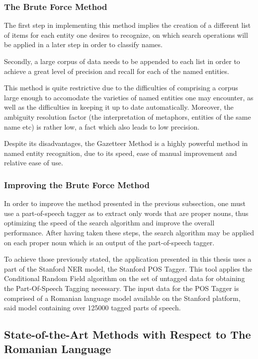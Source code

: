 \documentclass[12pt,a4paper]{article}
\begin{document}
\subsubsection{The Brute Force Method}
\qquad \quad The first step in implementing this method implies the creation of a different list of items for each entity one desires to recognize, on which search operations will be applied in a later step in order to classify names.

\qquad Secondly, a large corpus of data needs to be appended to each list in order to achieve a great level of precision and recall for each of the named entities.

\qquad This method is quite restrictive due to the difficulties of comprising a corpus large enough to accomodate the varieties of named entities one may encounter, as well as the difficulties in keeping it up to date automatically. Moreover, the ambiguity resolution factor (the interpretation of metaphors, entities of the same name etc) is rather low, a fact which also leads to low precision.

\qquad Despite its disadvantages, the Gazetteer Method is a highly powerful method in named entity recognition, due to its speed, ease of manual improvement and relative ease of use.

\subsubsection{Improving the Brute Force Method}

\qquad \quad In order to improve the method presented in the previous subsection, one must use a part-of-speech tagger as to extract only words that are proper nouns, thus optimizing the speed of the search algorithm and improve the overall performance. After having taken these steps, the search algorithm may be applied on each proper noun which is an output of the part-of-speech tagger.

\quad To achieve those previously stated, the application presented in this thesis uses a part of the Stanford NER model, the Stanford POS Tagger. This tool applies the Conditional Random Field algorithm on the set of untagged data for obtaining the Part-Of-Speech Tagging necessary. The input data for the POS Tagger is comprised of a Romanian language model available on the Stanford platform, said model containing over 125000 tagged parts of speech.

\subsection{State-of-the-Art Methods with Respect to The Romanian Language}
\end{document}
